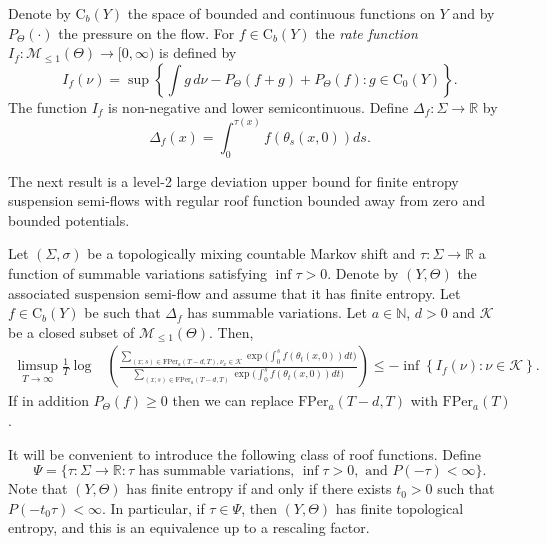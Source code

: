 \documentclass[letterpaper,11pt]{amsart}
\numberwithin{equation}{section}     %
\newcommand{\K}{\mathcal{K}}
\newcommand{\M}{\mathcal{M}}
\newcommand{\R}{\mathbb{R}}
\newcommand{\N}{\mathbb{N}}
\def\R{{\mathbb R}}
\def\N{{\mathbb N}}
\def\M{{\mathcal M}}
\def\le{\leqslant}
\def\ge{\geqslant}
\def\M{\mathcal{M}}
\begin{document}
Denote by $\mathrm{C}_b(Y)$ the space of bounded and continuous functions on $Y$ and by $P_\Theta(\cdot)$ the pressure on the flow. For $f\in \mathrm{C}_b(Y)$ 
the \emph{rate function} $I_f:\M_{\leq 1}(\Theta) \to [0,\infty)$ is defined by
\begin{equation*}
I_f(\nu)= \sup \left\{ \int g\, d \nu -P_\Theta(f+g)  +P_\Theta(f) : g \in \text{C}_0(Y)	\right\}.
\end{equation*}
The function $I_f$ is non-negative and lower semicontinuous. Define $\Delta_f:\Sigma\to\R$  by $$\Delta_f(x)=\int_0^{\tau(x)}f(\theta_s(x,0))ds.$$  

The next result is a level-2 large deviation upper bound for finite entropy suspension semi-flows with regular roof function bounded away from zero  and bounded potentials. 

\begin{theorem}\label{thm_ldp2} Let $(\Sigma,\sigma)$ be a topologically mixing countable Markov shift and  $\tau:\Sigma\to\R$ a function of summable variations satisfying $\inf\tau>0$. Denote by  $(Y,\Theta)$ the associated suspension semi-flow and assume that it has finite entropy. Let $f\in \mathrm{C}_b(Y)$ be such that  $\Delta_f$ has summable variations. Let $a\in \N$, $d>0$ and $\mathcal{K}$ be a closed subset of $\M_{\le 1}(\Theta)$. Then,
\begin{align*}
\limsup_{T \to \infty} \frac{1}{T} \log  &\left(\frac{\sum_{(x;s)\in \mathrm{FPer}_a(T-d,T), \nu_{x}\in \mathcal{K}}\exp\big(\int_0^{s}f(\theta_t(x,0))dt\big)}{\sum_{(x;s)\in \mathrm{FPer}_a(T-d,T)}\exp\big(\int_0^{s}f(\theta_t(x,0))dt\big)}\right) \leq - \inf \left\{I_f(\nu) : \nu \in \K \right\}.
\end{align*}
If in addition $P_{\Theta}(f)\ge0$ then we can replace $\mathrm{FPer}_a(T-d,T)$ with $\mathrm{FPer}_a(T)$.  
\end{theorem}

It will be convenient to introduce the following class of roof functions. Define  
 $$\Psi=\{\tau \colon \Sigma \to \mathbb{R}: \tau \text{ has summable variations, }\inf \tau > 0, \text{ and } P(-\tau)<\infty\}.$$
 Note that  $(Y,\Theta)$ has finite entropy if and only if there exists $t_0 >0$ such that $P(-t_0\tau)<\infty$. In particular, if $\tau\in\Psi$, then $(Y,\Theta)$ has finite topological entropy, and this is an equivalence up to a rescaling factor. 
 
\end{document}
